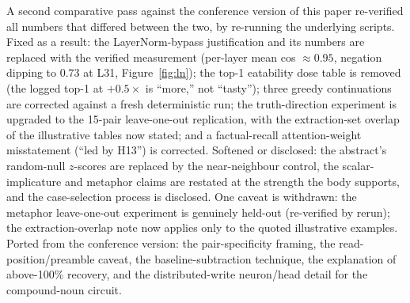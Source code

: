 \documentclass[11pt]{article}
\begin{document}
A second comparative pass against the conference version of this paper
re-verified all numbers that differed between the two, by re-running
the underlying scripts. Fixed as a result: the LayerNorm-bypass
justification and its numbers are replaced with the verified
measurement (per-layer mean cos $\approx 0.95$, negation dipping to
$0.73$ at L31, Figure~\ref{fig:ln}); the top-1 eatability dose table is
removed (the logged top-1 at $+0.5\times$ is ``more,'' not ``tasty'');
three greedy continuations are corrected against a fresh deterministic
run; the truth-direction experiment is upgraded to the 15-pair
leave-one-out replication, with the extraction-set overlap of the
illustrative tables now stated; and a factual-recall attention-weight
misstatement (``led by H13'') is corrected. Softened or disclosed: the
abstract's random-null $z$-scores are replaced by the near-neighbour
control, the scalar-implicature and metaphor claims are restated at the
strength the body supports, and the case-selection process is
disclosed. One caveat is withdrawn: the metaphor leave-one-out
experiment is genuinely held-out (re-verified by rerun); the
extraction-overlap note now applies only to the quoted illustrative
examples. Ported from the conference version: the pair-specificity
framing, the read-position/preamble caveat, the baseline-subtraction
technique, the explanation of above-100\% recovery, and the
distributed-write neuron/head detail for the compound-noun circuit.



\end{document}
